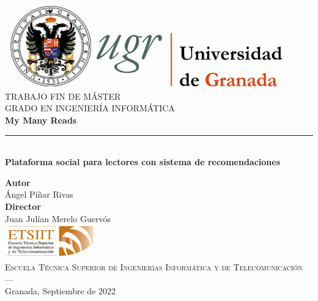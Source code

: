\begin{titlepage}
\newlength{\centeroffset}
\setlength{\centeroffset}{-0.5\oddsidemargin}
\addtolength{\centeroffset}{0.5\evensidemargin}
\thispagestyle{empty}

\noindent\hspace*{\centeroffset}\begin{minipage}{\textwidth}

\centering
\includegraphics[width=0.9\textwidth]{logos/logo_ugr.jpg}\\[1.4cm]

\textsc{ \Large TRABAJO FIN DE MÁSTER\\[0.2cm]}
\textsc{ GRADO EN INGENIERÍA INFORMÁTICA}\\[1cm]

{\Huge\bfseries My Many Reads \\}
\noindent\rule[-1ex]{\textwidth}{3pt}\\[3.5ex]
{\large\bfseries Plataforma social para lectores con sistema de recomendaciones }
\end{minipage}

\vspace{2.5cm}
\noindent\hspace*{\centeroffset}
\begin{minipage}{\textwidth}
\centering

\textbf{Autor}\\ {Ángel Píñar Rivas}\\[2.5ex]
\textbf{Director}\\ {Juan Julían Merelo Guervós}\\[2cm]
\includegraphics[width=0.3\textwidth]{logos/etsiit_logo.png}\\[0.1cm]
\textsc{Escuela Técnica Superior de Ingenierías Informática y de Telecomunicación}\\
\textsc{---}\\
Granada, Septiembre de 2022
\end{minipage}
\end{titlepage}

